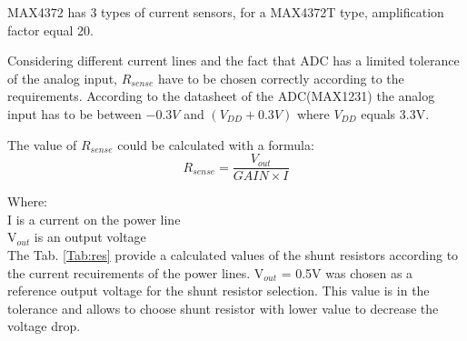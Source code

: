   MAX4372 has 3 types of current sensors, for a MAX4372T type, amplification factor equal 20.
  
  Considering different current lines and the fact that ADC has a limited tolerance of the analog input, $R_{sense}$ have to be chosen correctly according to the requirements. According to the datasheet of the ADC(MAX1231) the analog input has to be between $ -0.3V$ and $(V_{DD} + 0.3V)$ where $V_{DD}$ equals 3.3V.
  
  The value of $R_{sense}$ could be calculated with a formula:
    \begin{equation}
    R_{sense} = \frac{V_{out}}{GAIN \times I}
    \end{equation}
  
  Where:\\
  I is a current on the power line\\
  V$_{out}$ is an output voltage\\ 
 
 The Tab. \ref{Tab:res} provide a calculated values of the shunt resistors according to the current recuirements of the power lines. V$_{out}$ = 0.5V was chosen as a reference output voltage for the shunt resistor selection. This value is in the tolerance and allows to choose shunt resistor with lower value to decrease the voltage drop.
  \newpage
  
